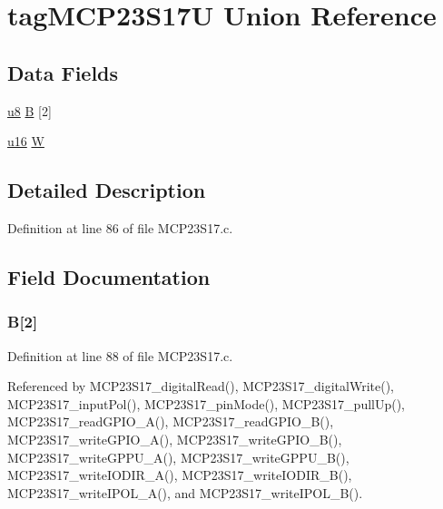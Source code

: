 \hypertarget{uniontag_m_c_p23_s17_u}{\section{tag\-M\-C\-P23\-S17\-U Union Reference}
\label{uniontag_m_c_p23_s17_u}
}
\subsection*{Data Fields}
\begin{DoxyCompactItemize}
\item 
\hyperlink{p8_2pinguino_2core_2typedef_8h_aed742c436da53c1080638ce6ef7d13de}{u8} \hyperlink{uniontag_m_c_p23_s17_u_afbf45cd436efe78db33ea8692e838fef}{B} \mbox{[}2\mbox{]}
\item 
\hyperlink{p8_2pinguino_2core_2typedef_8h_a50b0d1c7a54fa09a64a3ac111c778520}{u16} \hyperlink{uniontag_m_c_p23_s17_u_a46abd0e479371c5e886b9236e98ce322}{W}
\end{DoxyCompactItemize}


\subsection{Detailed Description}


Definition at line 86 of file M\-C\-P23\-S17.\-c.



\subsection{Field Documentation}
\hypertarget{uniontag_m_c_p23_s17_u_afbf45cd436efe78db33ea8692e838fef}{
\subsubsection[{B}]{ B\mbox{[}2\mbox{]}}}\label{uniontag_m_c_p23_s17_u_afbf45cd436efe78db33ea8692e838fef}


Definition at line 88 of file M\-C\-P23\-S17.\-c.



Referenced by M\-C\-P23\-S17\-\_\-digital\-Read(), M\-C\-P23\-S17\-\_\-digital\-Write(), M\-C\-P23\-S17\-\_\-input\-Pol(), M\-C\-P23\-S17\-\_\-pin\-Mode(), M\-C\-P23\-S17\-\_\-pull\-Up(), M\-C\-P23\-S17\-\_\-read\-G\-P\-I\-O\-\_\-\-A(), M\-C\-P23\-S17\-\_\-read\-G\-P\-I\-O\-\_\-\-B(), M\-C\-P23\-S17\-\_\-write\-G\-P\-I\-O\-\_\-\-A(), M\-C\-P23\-S17\-\_\-write\-G\-P\-I\-O\-\_\-\-B(), M\-C\-P23\-S17\-\_\-write\-G\-P\-P\-U\-\_\-\-A(), M\-C\-P23\-S17\-\_\-write\-G\-P\-P\-U\-\_\-\-B(), M\-C\-P23\-S17\-\_\-write\-I\-O\-D\-I\-R\-\_\-\-A(), M\-C\-P23\-S17\-\_\-write\-I\-O\-D\-I\-R\-\_\-\-B(), M\-C\-P23\-S17\-\_\-write\-I\-P\-O\-L\-\_\-\-A(), and M\-C\-P23\-S17\-\_\-write\-I\-P\-O\-L\-\_\-\-B().

